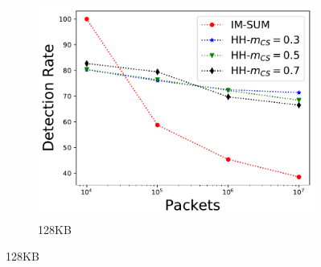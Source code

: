 \begin{figure}
\begin{subfigure}[t]{0.32\textwidth}
    \includegraphics[width=\linewidth]{HH/figures/DR_per_pkts_m=0.125.pdf}
    \caption{128KB}
    \label{fig:fig2_c}
\end{subfigure}


\end{figure}
